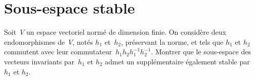 \section{Sous-espace stable}

Soit~$V$ un espace vectoriel normé de dimension finie.
On considère deux endomorphismes de~$V$, notés $h_1$ et~$h_2$, préservant la norme, et tels que $h_1$ et $h_2$ commutent avec leur commutateur~$h_1h_2h_1^{-1}h_2^{-1}$.
Montrer que le sous-espace des vecteurs invariants par~$h_1$ et $h_2$ admet un supplémentaire également stable par $h_1$ et $h_2$.

